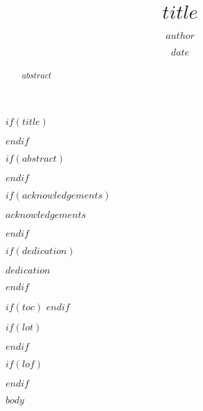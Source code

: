 \documentclass{imperialthesis}
\title{$title$}
\author{$author$}
\date{$date$}
\begin{document}
$if(title)$
\maketitle
$endif$

\begin{declaration}
\end{declaration}

\begin{copyrightdec}
\end{copyrightdec}

$if(abstract)$
\begin{abstract}
$abstract$
\end{abstract}
$endif$

$if(acknowledgements)$
\begin{acknowledgements}
$acknowledgements$
\end{acknowledgements}
$endif$

$if(dedication)$
\begin{dedication}
$dedication$
\end{dedication}
$endif$

$if(toc)$
\tableofcontents
$endif$

$if(lot)$
\listoftables
$endif$

$if(lof)$
\listoffigures
$endif$

$body$

\newpage
\end{document}
